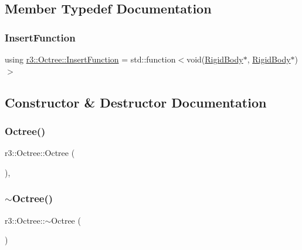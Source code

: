 \subsection{Member Typedef Documentation}
\mbox{\label{classr3_1_1_octree_a39df948aedb55b9aaea780e7c6790bbd}} 
\subsubsection{\texorpdfstring{Insert\+Function}{InsertFunction}}
{\footnotesize\ttfamily using \mbox{\hyperlink{classr3_1_1_octree_a39df948aedb55b9aaea780e7c6790bbd}{r3\+::\+Octree\+::\+Insert\+Function}} =  std\+::function$<$void(\mbox{\hyperlink{classr3_1_1_rigid_body}{Rigid\+Body}}$\ast$, \mbox{\hyperlink{classr3_1_1_rigid_body}{Rigid\+Body}}$\ast$)$>$}



\subsection{Constructor \& Destructor Documentation}
\mbox{\label{classr3_1_1_octree_a200bd5344aeb1a4104cc0ade928ed351}} 
\subsubsection{\texorpdfstring{Octree()}{Octree()}}
{\footnotesize\ttfamily r3\+::\+Octree\+::\+Octree (\begin{DoxyParamCaption}{ }\end{DoxyParamCaption})\hspace{0.3cm}{\ttfamily [explicit]}, {\ttfamily [default]}}

\mbox{\label{classr3_1_1_octree_aa7940964258297d65ecad5e30223b774}} 
\subsubsection{\texorpdfstring{$\sim$\+Octree()}{~Octree()}}
{\footnotesize\ttfamily r3\+::\+Octree\+::$\sim$\+Octree (\begin{DoxyParamCaption}{ }\end{DoxyParamCaption})\hspace{0.3cm}{\ttfamily [default]}}




